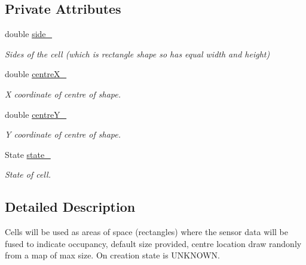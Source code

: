 \subsection*{Private Attributes}
\begin{DoxyCompactItemize}
\item 
double \hyperlink{classCell_a5a5d7019386c126d1bd3920289a08c42}{side\+\_\+}\hypertarget{classCell_a5a5d7019386c126d1bd3920289a08c42}{}\label{classCell_a5a5d7019386c126d1bd3920289a08c42}

\begin{DoxyCompactList}\small\item\em Sides of the cell (which is rectangle shape so has equal width and height) \end{DoxyCompactList}\item 
double \hyperlink{classCell_ab07d4ece32b7d7fbe4a3221c27eddae3}{centre\+X\+\_\+}\hypertarget{classCell_ab07d4ece32b7d7fbe4a3221c27eddae3}{}\label{classCell_ab07d4ece32b7d7fbe4a3221c27eddae3}

\begin{DoxyCompactList}\small\item\em X coordinate of centre of shape. \end{DoxyCompactList}\item 
double \hyperlink{classCell_adaa7675d333a26cb8651b340582afb32}{centre\+Y\+\_\+}\hypertarget{classCell_adaa7675d333a26cb8651b340582afb32}{}\label{classCell_adaa7675d333a26cb8651b340582afb32}

\begin{DoxyCompactList}\small\item\em Y coordinate of centre of shape. \end{DoxyCompactList}\item 
State \hyperlink{classCell_a574b020762ad6be999b79bfd25dc335b}{state\+\_\+}\hypertarget{classCell_a574b020762ad6be999b79bfd25dc335b}{}\label{classCell_a574b020762ad6be999b79bfd25dc335b}

\begin{DoxyCompactList}\small\item\em State of cell. \end{DoxyCompactList}\end{DoxyCompactItemize}


\subsection{Detailed Description}
Cells will be used as areas of space (rectangles) where the sensor data will be fused to indicate occupancy, default size provided, centre location draw randonly from a map of max size. On creation state is U\+N\+K\+N\+O\+WN. 

